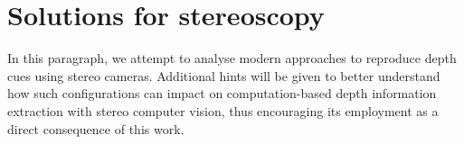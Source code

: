 \section{Solutions for stereoscopy}

In this paragraph, we attempt to analyse modern approaches to reproduce depth cues using stereo cameras. Additional hints will be given to better understand how such configurations can impact on computation-based depth information extraction with stereo computer vision, thus encouraging its employment as a direct consequence of this work.

